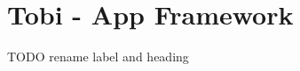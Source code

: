 \section{Tobi - App Framework}\label{sec:appframework}

TODO rename label and heading

\cite{anno4j2}
